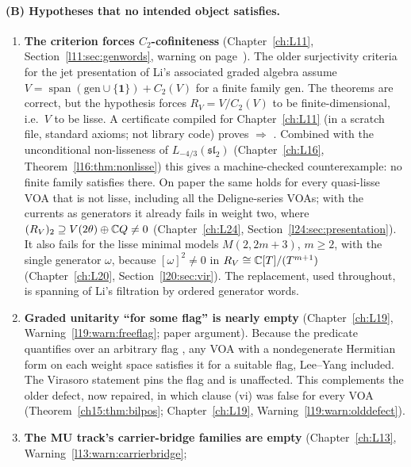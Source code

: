 \paragraph{(B) Hypotheses that no intended object satisfies.}
\begin{enumerate}
\item \textbf{The  criterion forces $C_2$-cofiniteness} (Chapter~\ref{ch:L11},
  Section~\ref{l11:sec:genwords}, warning on page~\pageref{l11:warn:hdec}). The older surjectivity criteria for the jet
  presentation of Li's associated graded algebra assume
  $V=\operatorname{span}(\mathrm{gen}\cup\{\mathbf 1\})+C_2(V)$ for a finite family $\mathrm{gen}$. The theorems are
  correct, but the hypothesis forces $R_V=V/C_2(V)$ to be finite-dimensional, i.e.\ $V$ to be lisse. A certificate
  compiled for Chapter~\ref{ch:L11} (in a scratch file, standard axioms; not library code) proves
   $\Rightarrow$ . Combined with the unconditional non-lisseness of
  $L_{-4/3}(\mathfrak{sl}_2)$ (Chapter~\ref{ch:L16}, Theorem~\ref{l16:thm:nonlisse}) this gives a machine-checked
  counterexample: no finite family satisfies  there. On paper the same holds for every quasi-lisse VOA that is not
  lisse, including all the Deligne-series VOAs; with the currents as generators it already fails in weight two, where
  $(R_V)_2\supseteq V(2\theta)\oplus{\mathbb{C}} Q\neq0$ (Chapter~\ref{ch:L24}, Section~\ref{l24:sec:presentation}). It also fails for
  the lisse minimal models $M(2,2m+3)$, $m\ge2$, with the single generator $\omega$, because $[\omega]^2\neq0$ in
  $R_V\cong{\mathbb{C}}[T]/(T^{m+1})$ (Chapter~\ref{ch:L20}, Section~\ref{l20:sec:vir}). The replacement, used throughout, is
  spanning of Li's filtration by ordered generator words.
\item \textbf{Graded unitarity ``for some flag'' is nearly empty} (Chapter~\ref{ch:L19}, Warning~\ref{l19:warn:freeflag};
  paper argument). Because the predicate  quantifies over an arbitrary flag , any VOA with
  a nondegenerate Hermitian form on each weight space satisfies it for a suitable flag, Lee--Yang included. The Virasoro
  statement  pins the flag and is unaffected. This complements the older defect, now repaired, in
  which clause (vi) was false for every VOA (Theorem~\ref{ch15:thm:bilpos}; Chapter~\ref{ch:L19},
  Warning~\ref{l19:warn:olddefect}).
\item \textbf{The MU track's carrier-bridge families are empty} (Chapter~\ref{ch:L13}, Warning~\ref{l13:warn:carrierbridge};

\end{enumerate}
